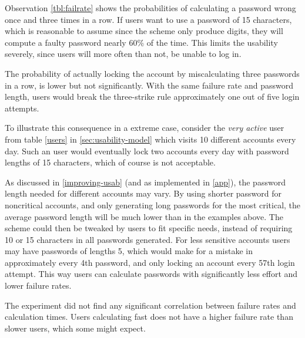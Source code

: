 \par Observation \ref{tbl:failrate} shows the probabilities of calculating a password wrong once and three times in a row. If users want to use a password of 15 characters, which is reasonable to assume since the scheme only produce digits, they will compute a faulty password nearly 60\% of the time. This limits the usability severely, since users will more often than not, be unable to log in.
\par The probability of actually locking the account by miscalculating three passwords in a row, is lower but not significantly. With the same failure rate and password length, users would break the three-strike rule approximately one out of five login attempts.

\par To illustrate this consequence in a extreme case, consider the \emph{very active} user from table \ref{users} in \autoref{sec:usability-model} which visits 10 different accounts every day. Such an user would eventually lock two accounts every day with password lengths of 15 characters, which of course is not acceptable.

\par As discussed in \autoref{improving-usab} (and as implemented in \autoref{app}), the password length needed for different accounts may vary. By using shorter password for noncritical accounts, and only generating long passwords for the most critical, the average password length will be much lower than in the examples above. The scheme could then be tweaked by users to fit specific needs, instead of requiring 10 or 15 characters in all passwords generated. For less sensitive accounts users may have passwords of lengths 5, which would make for a mistake in approximately every 4th password, and only locking an account every 57th login attempt. This way users can calculate passwords with significantly less effort and lower failure rates. 

\par The experiment did not find any significant correlation between failure rates and calculation times. Users calculating fast does not have a higher failure rate than slower users, which some might expect. 

